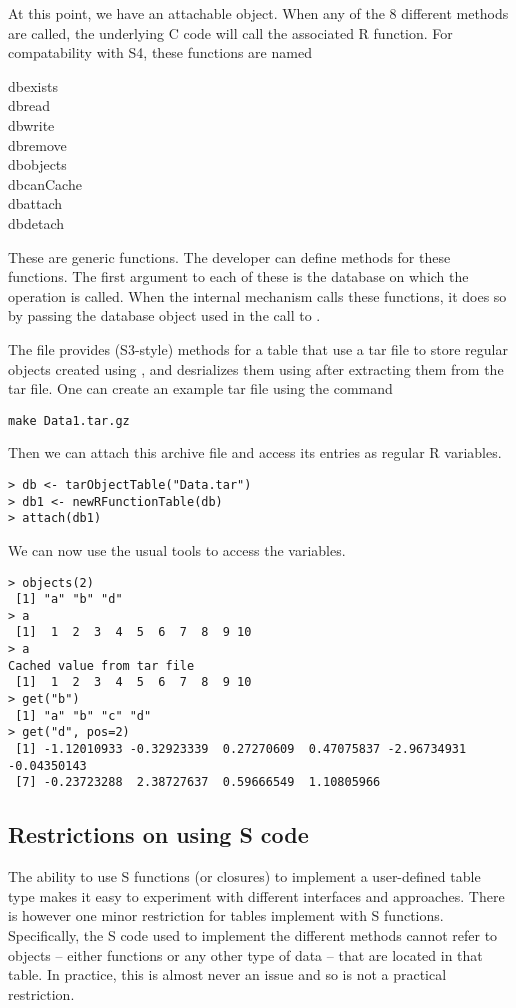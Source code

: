 \documentclass{article}
\begin{document}
At this point, we have an attachable object. When any of the $8$
different methods are called, the underlying C code will call the
associated R function.  For compatability with S4, these functions
are named
\begin{description}
\item[dbexists] 
\item[dbread]
\item[dbwrite]
\item[dbremove]
\item[dbobjects]
\item[dbcanCache]
\item[dbattach]
\item[dbdetach]
\end{description}
These are generic functions.  The developer can define methods for
these functions.  The first argument to each of these is the database
on which the operation is called.  When the internal mechanism calls
these functions, it does so by passing the database object used in the
call to .


The file  provides (S3-style) methods for a table
that use a tar file to store regular objects created using
, and desrializes them using  after
extracting them from the tar file.  One can create an example tar file
using the command
\begin{verbatim}
make Data1.tar.gz
\end{verbatim}
Then we can attach this archive file
and access its entries as regular R variables.
\begin{verbatim}
> db <- tarObjectTable("Data.tar") 
> db1 <- newRFunctionTable(db)
> attach(db1)
\end{verbatim}
We can now use the usual tools to access
the variables.
\begin{verbatim}
> objects(2)
 [1] "a" "b" "d"
> a
 [1]  1  2  3  4  5  6  7  8  9 10
> a
Cached value from tar file
 [1]  1  2  3  4  5  6  7  8  9 10
> get("b")
 [1] "a" "b" "c" "d"
> get("d", pos=2)
 [1] -1.12010933 -0.32923339  0.27270609  0.47075837 -2.96734931 -0.04350143
 [7] -0.23723288  2.38727637  0.59666549  1.10805966
\end{verbatim}



\subsection{Restrictions on using S code}\label{InfiniteRecursion}
The ability to use S functions (or closures) to implement a
user-defined table type makes it easy to experiment with different
interfaces and approaches.  There is however one minor restriction for
tables implement with S functions.  Specifically, the S code used to
implement the different methods cannot refer to objects --
either functions or any other type of data -- that are located in that
table. In practice, this is almost never an issue and so is not a
practical restriction.
\end{document}
